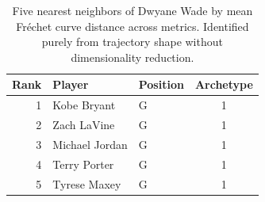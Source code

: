 \begin{table}[htbp]
  \centering\small
  \begin{tabular}{rllc}
    \toprule
    Rank & Player & Position & Archetype \\
    \midrule
    1 & Kobe Bryant & G & 1 \\
    2 & Zach LaVine & G & 1 \\
    3 & Michael Jordan & G & 1 \\
    4 & Terry Porter & G & 1 \\
    5 & Tyrese Maxey & G & 1 \\
    \bottomrule
  \end{tabular}
  \caption{Five nearest neighbors of Dwyane Wade by mean Fr\'{e}chet curve distance across metrics. Identified purely from trajectory shape without dimensionality reduction.}
  \label{tab:Dwyane_Wade_frechet_curve_neighbors}
\end{table}

